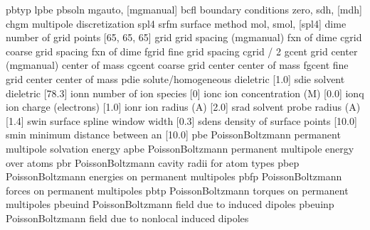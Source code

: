 \documentclass[letterpaper,11pt,english]{sphinxmanual}
\begin{document}
\begin{sphinxVerbatim}[commandchars=\\\{\}]
pbtyp           lpbe
pbsoln          mg\PYGZhy{}auto, [mg\PYGZhy{}manual]
bcfl            boundary conditions              zero, sdh, [mdh]
chgm            multipole discretization         spl4
srfm            surface method                   mol, smol, [spl4]
dime            number of grid points            [65, 65, 65]
grid            grid spacing (mg\PYGZhy{}manual)         fxn of \PYGZdq{}dime\PYGZdq{}
cgrid           coarse grid spacing              fxn of \PYGZdq{}dime\PYGZdq{}
fgrid           fine grid spacing                cgrid / 2
gcent           grid center (mg\PYGZhy{}manual)          center of mass
cgcent          coarse grid center               center of mass
fgcent          fine grid center                 center of mass
pdie            solute/homogeneous dieletric     [1.0]
sdie            solvent dieletric                [78.3]
ionn            number of ion species            [0]
ionc            ion concentration (M)            [0.0]
ionq            ion charge (electrons)           [1.0]
ionr            ion radius (A)                   [2.0]
srad            solvent probe radius (A)         [1.4]
swin            surface spline window width      [0.3]
sdens           density of surface points        [10.0]
smin            minimum distance between an      [10.0]
pbe             Poisson\PYGZhy{}Boltzmann permanent multipole solvation energy
apbe            Poisson\PYGZhy{}Boltzmann permanent multipole energy over atoms
pbr             Poisson\PYGZhy{}Boltzmann cavity radii for atom types
pbep            Poisson\PYGZhy{}Boltzmann energies on permanent multipoles
pbfp            Poisson\PYGZhy{}Boltzmann forces on permanent multipoles
pbtp            Poisson\PYGZhy{}Boltzmann torques on permanent multipoles
pbeuind         Poisson\PYGZhy{}Boltzmann field due to induced dipoles
pbeuinp         Poisson\PYGZhy{}Boltzmann field due to non\PYGZhy{}local induced dipoles
\end{sphinxVerbatim}

\end{document}
